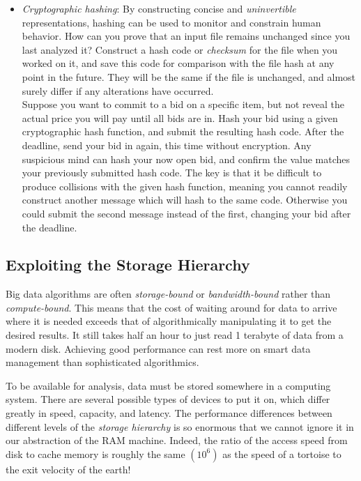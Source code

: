 \documentclass[10pt]{article}
\begin{document}
\begin{enumerate}
\begin{itemize}
    \item \textit{Cryptographic hashing}: By constructing concise and \textit{uninvertible} representations, hashing can be used to monitor and constrain human behavior. How can you prove that an input file remains unchanged since you last analyzed it? Construct a hash code or \textit{checksum} for the file when you worked on it, and save this code for comparison with the file hash at any point in the future. They will be the same if the file is unchanged, and almost surely differ if any alterations have occurred.\\
    Suppose you want to commit to a bid on a specific item, but not reveal the actual price you will pay until all bids are in. Hash your bid using a given cryptographic hash function, and submit the resulting hash code. After the deadline, send your bid in again, this time without encryption. Any suspicious mind can hash your now open bid, and confirm the value matches your previously submitted hash code. The key is that it be difficult to produce collisions with the given hash function, meaning you cannot readily construct another message which will hash to the same code. Otherwise you could submit the second message instead of the first, changing your bid after the deadline.
\end{itemize}

\subsection{Exploiting the Storage Hierarchy}
Big data algorithms are often \textit{storage-bound} or \textit{bandwidth-bound} rather than \textit{compute-bound}. This means that the cost of waiting around for data to arrive where it is needed exceeds that of algorithmically manipulating it to get the desired results. It still takes half an hour to just read 1 terabyte of data from a modern disk. Achieving good performance can rest more on smart data management than sophisticated algorithmics.

To be available for analysis, data must be stored somewhere in a computing system. There are several possible types of devices to put it on, which differ greatly in speed, capacity, and latency. The performance differences between different levels of the \textit{storage hierarchy} is so enormous that we cannot ignore it in our abstraction of the RAM machine. Indeed, the ratio of the access speed from disk to cache memory is roughly the same $\left(10^{6}\right)$ as the speed of a tortoise to the exit velocity of the earth!


\end{enumerate}
\end{document}
